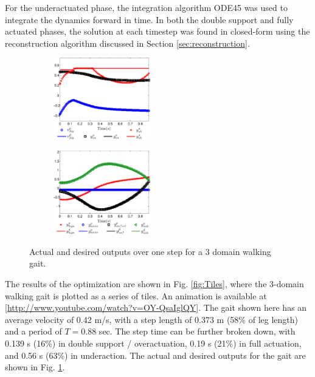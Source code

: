 For the underactuated phase, the integration algorithm ODE45
was used to integrate the dynamics forward in time.  In both the double support and fully actuated phases, the solution at each timestep was found in closed-form using the reconstruction algorithm discussed in Section \ref{sec:reconstruction}.
\begin{figure}[t!]
\centering
\begin{subfigure}{0.001\textwidth}
\includegraphics[width=42mm]{figures/YaVsYd1-crop.pdf}
\vspace{-42mm}
\end{subfigure}
\begin{subfigure}{0.75\textwidth}
\includegraphics[width=42mm]{figures/YaVsYd2-crop.pdf}

\end{subfigure}
\caption{Actual and desired outputs over one step for a 3 domain walking gait.}
\label{fig:Outputs}
\end{figure}
The results of the optimization are shown in Fig. \ref{fig:Tiles}, where the 3-domain walking gait is plotted as a series of tiles. 
An animation is available at [\url{http://www.youtube.com/watch?v=OY-QsaIglQY}].  The gait shown here has an average velocity of 0.42 m/s, with a step length
of 0.373 m (58\% of leg length) and a period of $T = 0.88$ sec. The step time can be further broken down, with 0.139 s (16\%) in double 
support / overactuation, 0.19 s (21\%) in full actuation, and 0.56 s (63\%) in underaction. The actual and desired outputs for the gait are shown in Fig. \ref{fig:Outputs}.

